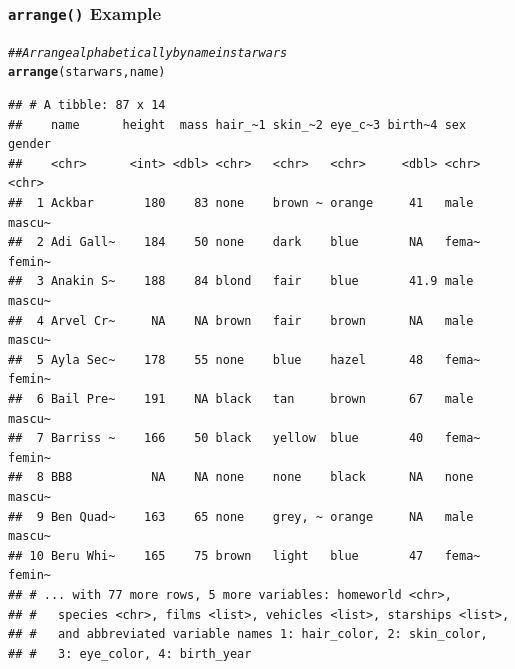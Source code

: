 \documentclass{beamer}\usepackage[]{graphicx}\usepackage[]{xcolor}
\makeatletter
\newcommand{\hlcom}[1]{\textcolor[rgb]{0.678,0.584,0.686}{\textit{#1}}}%
\newcommand{\hlstd}[1]{\textcolor[rgb]{0.345,0.345,0.345}{#1}}%
\newcommand{\hlkwd}[1]{\textcolor[rgb]{0.737,0.353,0.396}{\textbf{#1}}}%
\newenvironment{kframe}{%
 \def\at@end@of@kframe{}%
 \ifinner\ifhmode%
  \def\at@end@of@kframe{\end{minipage}}%
  \begin{minipage}{\columnwidth}%
 \fi\fi%
 \def\FrameCommand##1{\hskip\@totalleftmargin \hskip-\fboxsep
 \colorbox{shadecolor}{##1}\hskip-\fboxsep
     \hskip-\linewidth \hskip-\@totalleftmargin \hskip\columnwidth}%
 \MakeFramed {\advance\hsize-\width
   \@totalleftmargin\z@ \linewidth\hsize
   \@setminipage}}%
 {\par\unskip\endMakeFramed%
 \at@end@of@kframe}
\newenvironment{knitrout}{}{} %
\makeatother
\begin{document}
\begin{frame}[fragile]\frametitle{\texttt{arrange()} Example}
\begin{knitrout}\footnotesize
{}\color{fgcolor}\begin{kframe}
\begin{alltt}
\hlcom{## Arrange alphabetically by name in starwars}
\hlkwd{arrange}\hlstd{(starwars, name)}
\end{alltt}
\begin{verbatim}
## # A tibble: 87 x 14
##    name      height  mass hair_~1 skin_~2 eye_c~3 birth~4 sex   gender
##    <chr>      <int> <dbl> <chr>   <chr>   <chr>     <dbl> <chr> <chr> 
##  1 Ackbar       180    83 none    brown ~ orange     41   male  mascu~
##  2 Adi Gall~    184    50 none    dark    blue       NA   fema~ femin~
##  3 Anakin S~    188    84 blond   fair    blue       41.9 male  mascu~
##  4 Arvel Cr~     NA    NA brown   fair    brown      NA   male  mascu~
##  5 Ayla Sec~    178    55 none    blue    hazel      48   fema~ femin~
##  6 Bail Pre~    191    NA black   tan     brown      67   male  mascu~
##  7 Barriss ~    166    50 black   yellow  blue       40   fema~ femin~
##  8 BB8           NA    NA none    none    black      NA   none  mascu~
##  9 Ben Quad~    163    65 none    grey, ~ orange     NA   male  mascu~
## 10 Beru Whi~    165    75 brown   light   blue       47   fema~ femin~
## # ... with 77 more rows, 5 more variables: homeworld <chr>,
## #   species <chr>, films <list>, vehicles <list>, starships <list>,
## #   and abbreviated variable names 1: hair_color, 2: skin_color,
## #   3: eye_color, 4: birth_year
\end{verbatim}
\end{kframe}
\end{knitrout}
\end{frame}
\end{document}
